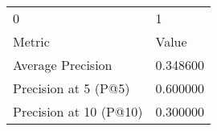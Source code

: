 \begin{tabular}{ll}
0 & 1 \\
Metric & Value \\
Average Precision & 0.348600 \\
Precision at 5 (P@5) & 0.600000 \\
Precision at 10 (P@10) & 0.300000 \\
\end{tabular}

